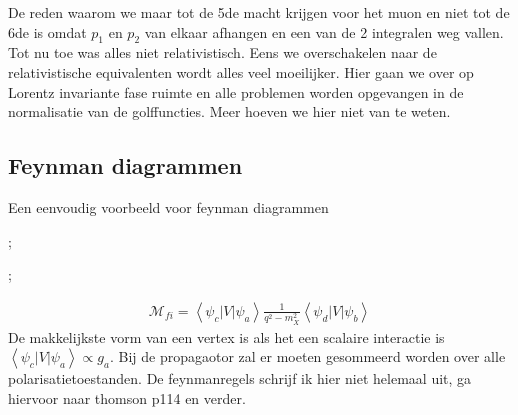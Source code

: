 \documentclass[../main.tex]{subfiles}
\begin{document}
De reden waarom we maar tot de 5de macht krijgen voor het muon en niet tot de 6de is omdat $p_1$ en $p_2$ van elkaar afhangen en een van de 2 integralen weg vallen.\\
Tot nu toe was alles niet relativistisch. Eens we overschakelen naar de relativistische equivalenten wordt alles veel moeilijker. Hier gaan we over op Lorentz invariante fase ruimte en alle problemen worden opgevangen in de normalisatie van de golffuncties. Meer hoeven we hier niet van te weten.

\subsection{Feynman diagrammen}%
\label{sub:feynman_diagrammen}

Een eenvoudig voorbeeld voor feynman diagrammen\\
\begin{minipage}[c]{0.5\textwidth}
    \begin{center}
        ;
    \end{center}
\end{minipage}\noindent
\begin{minipage}[c]{0.5\textwidth}
    \begin{center}
        ;
    \end{center}
\end{minipage}
\begin{equation}
    \begin{aligned}
        \label{eq:fd_voorbeeld}
        \mathcal{M}_{fi}=\left<\psi_c|V|\psi_a\right> \frac{1}{q^2-m_X^2} \left<\psi_d|V|\psi_b\right>
    \end{aligned}
\end{equation}
De makkelijkste vorm van een vertex is als het een scalaire interactie is $\left<\psi_c|V|\psi_a\right> \propto g_a$. Bij de propagaotor zal er moeten gesommeerd worden over alle polarisatietoestanden. De feynmanregels schrijf ik hier niet helemaal uit, ga hiervoor naar thomson p114 en verder.
\end{document}
